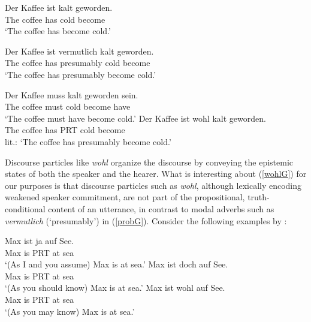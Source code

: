 \documentclass[11pt]{article}
\begin{document}
\begin{exe}
	\ex\label{german} \begin{xlist}
		\ex\label{bareG} \gll Der Kaffee ist kalt geworden. \\
		The coffee has cold become\\
		\glt `The coffee has become cold.'
				
		\ex\label{probG} \gll Der Kaffee ist vermutlich kalt geworden.\\
				The coffee has presumably cold become\\
		\glt `The coffee has presumably become cold.'

		\ex\label{mustG} \gll Der Kaffee muss kalt geworden sein. \\
						The coffee must  cold become have\\
		\glt `The coffee must have become cold.'
		\ex\label{wohlG} \gll Der Kaffee ist wohl kalt geworden.\\
						The coffee has PRT cold become\\
		\glt lit.: `The coffee has presumably become cold.'
	\end{xlist}
\end{exe}

Discourse particles like \emph{wohl} organize the discourse by conveying the epistemic states of both the speaker and the hearer. What is interesting about (\ref{wohlG}) for our purposes is that discourse particles such as \emph{wohl}, although lexically encoding weakened speaker commitment, are not part of the propositional, truth-conditional content of an utterance, in contrast to modal adverbs such as \emph{vermutlich} (`presumably’) in (\ref{probG}). Consider the following examples by \citet[][p.~2013]{Zimmermann2011}:

\begin{exe}
\ex \label{dparticles}
\begin{xlist}
\ex \gll Max ist	ja auf See.\\
Max is	 PRT at sea\\
\trans `(As I and you assume) Max is at sea.'
\ex \gll Max ist doch auf See.\\
Max is	 PRT at sea\\
\trans `(As you should know) Max is at sea.'
\ex \gll Max ist wohl auf See.\\
Max is	PRT at	sea\\
\trans `(As you may know) Max is at sea.'
\end{xlist}
\end{exe}
\end{document}
